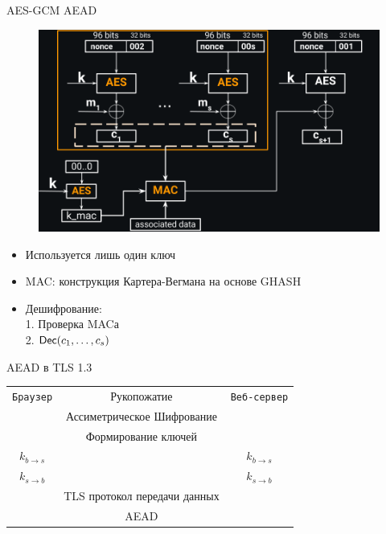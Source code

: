 \documentclass[usenames,dvipsnames,8pt,aspectratio=169]{beamer}
\begin{document}
\begin{frame}{AES-GCM AEAD}
\begin{figure}
\includegraphics[width=0.65\linewidth]{AES_GCM_AEAD_full}
\end{figure}

\Large
\begin{itemize}
\item Используется лишь один ключ
\item MAC: конструкция Картера-Вегмана на основе GHASH
\item Дешифрование: \\
1. Проверка MACа \\
2. $\textsf{Dec}(c_1, \ldots, c_s)$
\end{itemize}

\end{frame}

\begin{frame}{AEAD в TLS 1.3}
\LARGE
\begin{center}
\begin{tabular}{c c c }
\texttt{Браузер}&  {\color{Orange}{Фаза 1} Рукопожатие}   & \texttt{Веб-сервер}  \\
& {\Large Ассиметрическое Шифрование}  & \\ 
& {\Large Формирование ключей}  & \\ 
$k_{b\rightarrow s}$&  & $k_{b\rightarrow s}$\\ 
$k_{s\rightarrow b}$&  & $k_{s\rightarrow b}$  \\ [10pt]
&  {\color{Orange}{Фаза 2} TLS протокол передачи данных}   &  \\
& {\Large AEAD}  & \\ 
\end{tabular}
\end{center}
\end{frame}
\end{document}
